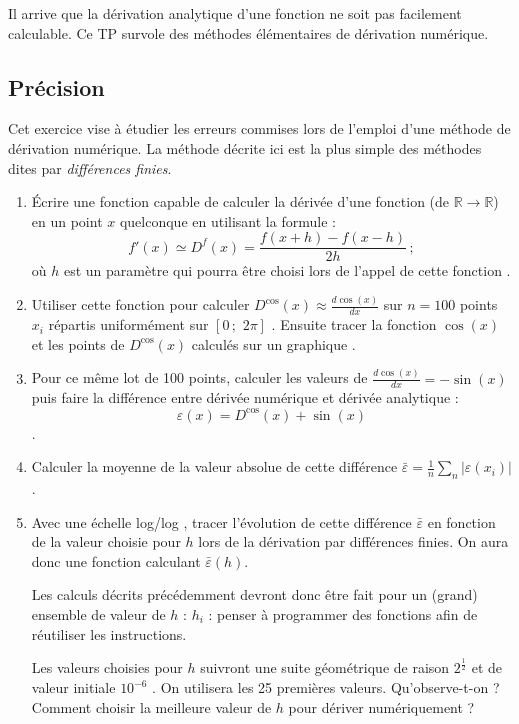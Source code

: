 Il  arrive que  la dérivation  analytique d'une  fonction ne  soit pas
facilement  calculable.  Ce TP  survole  des  méthodes élémentaires  de
dérivation numérique.

\subsection{Précision}
Cet exercice vise à étudier les erreurs commises lors de l'emploi d'une
méthode de dérivation numérique. La méthode décrite ici est
la plus simple des méthodes dites par \emph{différences finies}. 
\begin{enumerate}
\item Écrire une fonction capable de calculer la dérivée d'une fonction
  (de  $\mathbb{R}  \longrightarrow  \mathbb{R}$)   en  un  point  $x$
  quelconque en utilisant la formule :
  \begin{equation}
    f'(x) \simeq D^f(x) = \frac{f(x+h)-f(x-h)}{2h}\,; \label{eqDiffFinies}
  \end{equation}
  où $h$ est un  paramètre qui
  pourra   être   choisi   lors   de   l'appel   de   cette   fonction
  .  %
\item Utiliser cette fonction  pour calculer
  $D^{\cos} (x)\approx \frac{d\cos(x)}{dx}$ sur
  $n=100$ points $x_i$ répartis uniformément sur $[0\,;\,\,2\pi]$ .
  Ensuite tracer la  fonction $\cos(x)$ et les points de $D^{\cos} (x)$
  calculés sur un
  graphique .  %
\item  Pour ce même lot de 100 points,  calculer   les  valeurs   de
  $\frac{d\cos(x)}{dx}   =   -\sin(x)$   puis  faire   la   différence
  entre dérivée numérique et dérivée analytique :
  $$\varepsilon(x) = D^{\cos}(x)+\sin(x)$$%
.
\item Calculer la moyenne
  de la valeur  absolue de  cette différence
  $\bar{\varepsilon} = \frac{1}{n}\sum_n |\varepsilon(x_i)|$.
\item Avec  une échelle  log/log ,
  tracer  l'évolution de  cette différence
  $\bar{\varepsilon}$         en        fonction         de la
  valeur choisie pour $h$ lors de la dérivation par différences finies. 
  On aura donc une fonction calculant $\bar{\varepsilon}(h)$.

  Les calculs décrits précédemment 
  devront donc être fait pour un (grand) ensemble de valeur de $h$ : ${h_i}$ :
  penser à programmer des fonctions afin de réutiliser les instructions.
  
  Les valeurs choisies pour $h$ suivront
  une  suite  géométrique  de  raison  $2^\frac{1}{2}$  et  de  valeur
  initiale  $10^{-6}$ .   On  utilisera  les 25  premières
  valeurs.  Qu'observe-t-on ?  Comment  choisir la meilleure valeur de
  $h$ pour dériver numériquement ?
\end{enumerate}


